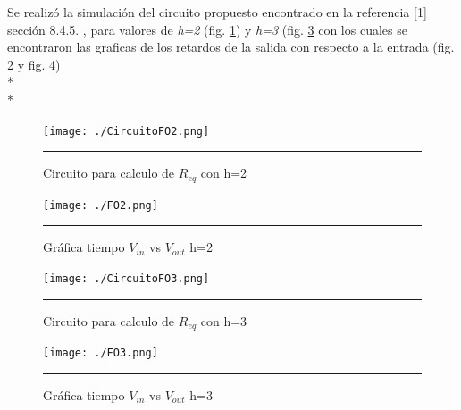\documentclass[12pt,a4paper]{article} %
\begin{document}
Se realizó la simulación del circuito propuesto encontrado en la referencia [1] sección 8.4.5. , para valores de \textit{h=2} (fig. \ref{fig:CircuitoFO2}) y \textit{h=3} (fig. \ref{fig:CircuitoFO3} con los cuales se encontraron las graficas de los retardos de la salida con respecto a la entrada (fig. \ref{fig:FO2} y fig. \ref{fig:FO3})\\*
\\*
\begin{figure}[htbp]
\begin{center}
    \texttt{[image: ./CircuitoFO2.png]}
    \rule{35em}{0.5pt}
  \caption[Captura]{Circuito para calculo de $R_{eq}$ con h=2}
  \label{fig:CircuitoFO2}
  \end{center}
\end{figure}

\begin{figure}[htbp]
  \centering
    \texttt{[image: ./FO2.png]}
    \rule{35em}{1pt}
  \caption[Captura]{Gráfica tiempo $V_{in}$ vs $V_{out}$ h=2}
  \label{fig:FO2}
\end{figure}

\begin{figure}[htbp]
\begin{center}
    \texttt{[image: ./CircuitoFO3.png]}
    \rule{35em}{0.5pt}
  \caption[Captura]{Circuito para calculo de $R_{eq}$ con h=3}
  \label{fig:CircuitoFO3}
  
\end{center}
\end{figure}

\begin{figure}[htbp]
  \begin{center}
    \texttt{[image: ./FO3.png]}
    \rule{35em}{0.5pt}
  \caption[Captura]{Gráfica tiempo $V_{in}$ vs $V_{out}$ h=3}
  \label{fig:FO3}
  \end{center}
\end{figure}
\end{document}

